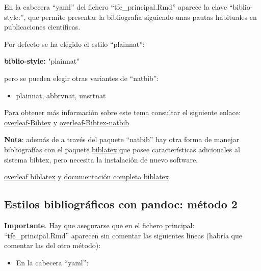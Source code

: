 \documentclass[12pt,a4paper,]{book}
\newenvironment{Shaded}{\begin{snugshade}}{\end{snugshade}}
\newcommand{\AttributeTok}[1]{\textcolor[rgb]{0.13,0.29,0.53}{#1}}
\newcommand{\FunctionTok}[1]{\textcolor[rgb]{0.13,0.29,0.53}{\textbf{#1}}}
\newcommand{\KeywordTok}[1]{\textcolor[rgb]{0.13,0.29,0.53}{\textbf{#1}}}
\newcommand{\StringTok}[1]{\textcolor[rgb]{0.31,0.60,0.02}{#1}}
\providecommand{\tightlist}{%
  \setlength{\itemsep}{0pt}\setlength{\parskip}{0pt}}
\numberwithin{dummy}{section}
\theoremstyle{ocrenumbox}
\theoremstyle{blacknumex}
\theoremstyle{blacknumbox}
\theoremstyle{ocrenum}
\theoremstyle{ocrenum}
\begin{document}
En la cabecera ``yaml'' del fichero ``tfe\_principal.Rmd'' aparece la
clave ``biblio-style:'', que permite presentar la bibliografía siguiendo
unas pautas habituales en publicaciones científicas.

Por defecto se ha elegido el estilo ``plainnat'':

\begin{Shaded}
\begin{Highlighting}[]
\FunctionTok{biblio{-}style}\KeywordTok{:}\AttributeTok{ }\StringTok{"plainnat"}\AttributeTok{ }
\end{Highlighting}
\end{Shaded}

pero se pueden elegir otras variantes de ``natbib'':

\begin{itemize}
\tightlist
\item
  plainnat, abbrvnat, unsrtnat
\end{itemize}

Para obtener más información sobre este tema consultar el siguiente
enlace:
\href{https://www.overleaf.com/learn/latex/Bibtex_bibliography_styles}{overleaf-Bibtex}
y
\href{https://www.overleaf.com/learn/latex/Bibliography_management_with_natbib}{overleaf-Bibtex-natbib}

\textbf{Nota}: además de a través del paquete ``natbib'' hay otra forma
de manejar bibliografías con el paquete
\href{https://www.overleaf.com/learn/latex/Bibliography_management_with_biblatex}{biblatex}
que posee características adicionales al sistema bibtex, pero necesita
la instalación de nuevo software.

\href{https://www.overleaf.com/learn/latex/Articles/Getting_started_with_BibLaTeX}{overleaf
biblatex} y
\href{http://mirror.ox.ac.uk/sites/ctan.org/macros/latex/contrib/biblatex/doc/biblatex.pdf}{documentación
completa biblatex}

\hypertarget{bibliografiametodo2}{%
\subsection{Estilos bibliográficos con pandoc: método
2}\label{bibliografiametodo2}}

\textbf{Importante}. Hay que asegurarse que en el fichero principal:
``tfe\_principal.Rmd'' aparecen sin comentar las siguientes líneas
(habría que comentar las del otro método):

\begin{itemize}
\tightlist
\item
  En la cabecera ``yaml'':
\end{itemize}
\end{document}
